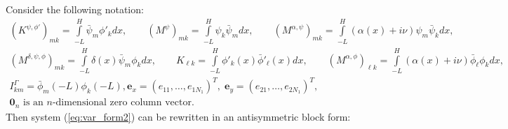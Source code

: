 Consider the following notation:
\begin{align*}
\left(K^{\psi,\phi'}\right)_{mk}=\int\limits_{-L}^{H}\bar{\psi}_{m}\phi'_{k}dx,\qquad \left(M^{\psi}\right)_{mk}=\int\limits_{-L}^{H}\psi_{k}\bar{\psi}_{m}dx, \qquad 
\left(M^{\alpha,\psi}\right)_{mk}=\int\limits_{-L}^{H}(\alpha(x)+i\nu)\psi_{m}\bar{\psi}_{k}dx, \\
\left(M^{\delta,\psi,\phi}\right)_{mk}=\int\limits_{-L}^{H}\delta(x)\bar{\psi}_{m}\phi_{k}dx, \qquad 
K_{\ell k}=\int\limits_{-L}^{H}\phi'_{k}(x)\bar{\phi}'_{\ell}(x)dx,\qquad
\left(M^{\alpha,\phi}\right)_{\ell k}=\int\limits_{-L}^{H}(\alpha(x)+i\nu)\bar{\phi}_{\ell}\phi_{k}dx,\\
I_{km}^{\Gamma}=\bar{\phi}_{m}(-L)\phi_{k}(-L), 
\boldsymbol{e}_{x}=\left(e_{11},\ldots,e_{1 N_{1}}\right)^{T},\; \boldsymbol{e}_{y}=\left(e_{21},\ldots,e_{2 N_{1}}\right)^{T},\\
\boldsymbol{0}_{n} \text{ is an $n$-dimensional zero column vector}.
\end{align*}
Then system (\ref{eq:var_form2}) can be rewritten in an antisymmetric block form:
